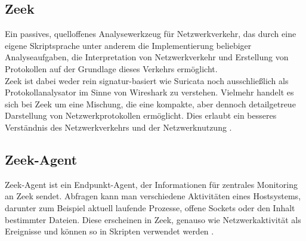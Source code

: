 \subsection{Zeek}
Ein passives, quelloffenes Analysewerkzeug für Netzwerkverkehr, das durch eine eigene Skriptsprache unter anderem die Implementierung beliebiger Analyseaufgaben, die Interpretation von Netzwerkverkehr und Erstellung von Protokollen auf der Grundlage dieses Verkehrs ermöglicht.\\
Zeek ist dabei weder rein signatur-basiert wie Suricata noch ausschließlich als Protokollanalysator im Sinne von Wireshark zu verstehen. Vielmehr handelt es sich bei Zeek um eine Mischung, die eine kompakte, aber dennoch detailgetreue Darstellung von Netzwerkprotokollen ermöglicht. Dies erlaubt ein besseres Verständnis des Netzwerkverkehrs und der Netzwerknutzung \cite{zeek_about_page}.

\subsection{Zeek-Agent}
Zeek-Agent ist ein Endpunkt-Agent, der Informationen für zentrales Monitoring an Zeek sendet.
Abfragen kann man verschiedene Aktivitäten eines Hostsystems, darunter zum Beispiel aktuell laufende Prozesse, offene Sockets oder den Inhalt bestimmter Dateien. Diese erscheinen in Zeek, genauso wie Netzwerkaktivität als Ereignisse und können so in Skripten verwendet werden \cite{zeek_agent}.
\pagebreak

